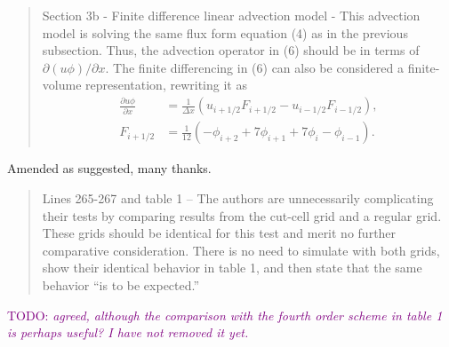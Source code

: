 \documentclass{article}
\newcommand{\TODO}[1]{\textcolor{purple}{TODO: \emph{#1}}}
\begin{document}
\begin{quotation}
	Section 3b - Finite difference linear advection model - This advection model is solving the same flux form equation (4) as in the previous subsection. Thus, the advection operator in (6) should be in terms of $\partial (u\phi)/\partial x$.  The finite differencing in (6) can also be considered a finite-volume representation, rewriting it as 
	\begin{align*}
		\frac{\partial u \phi}{\partial x} &= \frac{1}{\Delta x} \left( u_{i+1/2} F_{i+1/2} - u_{i - 1/2} F_{i - 1/2}\right), \\
		F_{i+1/2} &= \frac{1}{12} \left( - \phi_{i+2} + 7 \phi_{i+1} + 7 \phi_i - \phi_{i-1} \right).
	\end{align*}
\end{quotation}
Amended as suggested, many thanks.

\begin{quotation}
 Lines 265-267 and table 1 – The authors are unnecessarily complicating their tests  by comparing results from the cut-cell grid and a regular grid. These grids should be identical for this test and merit no further comparative consideration. There is no need to simulate with both grids, show their identical behavior in table 1, and then  state that the same behavior ``is to be expected.''
\end{quotation}
\TODO{agreed, although the comparison with the fourth order scheme in table 1 is perhaps useful?  I have not removed it yet.}
\end{document}
